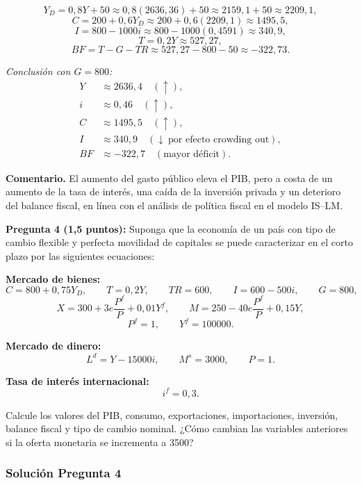 \documentclass[11pt,addpoints]{article}
\begin{document}
\[
Y_D = 0{,}8Y + 50 \approx 0{,}8(2636{,}36) + 50 \approx 2159{,}1 + 50 \approx 2209{,}1,
\]
\[
C = 200 + 0{,}6Y_D \approx 200 + 0{,}6(2209{,}1) \approx 1495{,}5,
\]
\[
I = 800 - 1000i \approx 800 - 1000(0{,}4591) \approx 340{,}9,
\]
\[
T = 0{,}2Y \approx 527{,}27,
\]
\[
BF = T - G - TR \approx 527{,}27 - 800 - 50 \approx -322{,}73.
\]

\emph{Conclusión con $G=800$:}
\begin{align*}
Y &\approx 2636{,}4 \quad (\uparrow), \\
i &\approx 0{,}46 \quad (\uparrow), \\
C &\approx 1495{,}5 \quad (\uparrow), \\
I &\approx 340{,}9 \quad (\downarrow\ \text{por efecto crowding out}), \\
BF &\approx -322{,}7 \quad (\text{mayor déficit}).
\end{align*}

\medskip

\newpage
\vspace*{0.5cm}
\textbf{Comentario.}  
El aumento del gasto público eleva el PIB, pero a costa de un aumento de la tasa de interés, una caída de la inversión privada y un deterioro del balance fiscal, en línea con el análisis de política fiscal en el modelo IS--LM.

\vspace{0.4cm}

\textbf{Pregunta 4 (1{,}5 puntos):}  
Suponga que la economía de un país con tipo de cambio flexible y perfecta movilidad de capitales se puede caracterizar en el corto plazo por las siguientes ecuaciones:

\textbf{Mercado de bienes:}
\[
C = 800 + 0{,}75Y_D, \qquad T = 0{,}2Y, \qquad TR = 600, \qquad I = 600 - 500i, \qquad G = 800,
\]
\[
X = 300 + 3e\frac{P^f}{P} + 0{,}01Y^f, \qquad M = 250 - 40e\frac{P^f}{P} + 0{,}15Y,
\]
\[
P^f = 1, \qquad Y^f = 100000.
\]

\textbf{Mercado de dinero:}
\[
L^d = Y - 15000i, \qquad M^s = 3000, \qquad P = 1.
\]

\textbf{Tasa de interés internacional:}
\[
i^f = 0{,}3.
\]

Calcule los valores del PIB, consumo, exportaciones, importaciones, inversión, balance fiscal y tipo de cambio nominal.  
¿Cómo cambian las variables anteriores si la oferta monetaria se incrementa a 3500?

\subsubsection*{Solución Pregunta 4}
\end{document}
